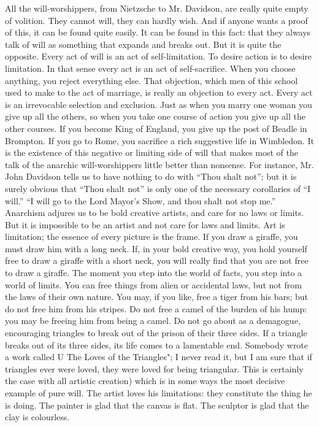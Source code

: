 \documentclass{book}
\begin{document}
All the will-worshippers, from Nietzsche to Mr. Davidson, are really quite empty of volition. They cannot will, they can hardly wish. And if anyone wants a proof of this, it can be found quite easily. It can be found in this fact: that they always talk of will as something that expands and breaks out. But it is quite the opposite. Every act of will is an act of self-limitation. To desire action is to desire limitation. In that sense every act is an act of self-sacrifice. When you choose anything, you reject everything else. That objection, which men of this school used to make to the act of marriage, is really an objection to every act. Every act is an irrevocable selection and exclusion. Just as when you marry one woman you give up all the others, so when you take one course of action you give up all the other courses. If you become King of England, you give up the post of Beadle in Brompton. If you go to Rome, you sacrifice a rich suggestive life in Wimbledon. It is the existence of this negative or limiting side of will that makes most of the talk of the anarchic will-worshippers little better than nonsense. For instance, Mr. John Davidson tells us to have nothing to do with “Thou shalt not”; but it is surely obvious that “Thou shalt not” is only one of the necessary corollaries of “I will.” “I will go to the Lord Mayor’s Show, and thou shalt not stop me.” Anarchism adjures us to be bold creative artists, and care for no laws or limits. But it is impossible to be an artist and not care for laws and limits. Art is limitation; the essence of every picture is the frame. If you draw a giraffe, you must draw him with a long neck. If, in your bold creative way, you hold yourself free to draw a giraffe with a short neck, you will really find that you are not free to draw a giraffe. The moment you step into the world of facts, you step into a world of limits. You can free things from alien or accidental laws, but not from the laws of their own nature. You may, if you like, free a tiger from his bars; but do not free him from his stripes. Do not free a camel of the burden of his hump: you may be freeing him from being a camel. Do not go about as a demagogue, encouraging triangles to break out of the prison of their three sides. If a triangle breaks out of its three sides, its life comes to a lamentable end. Somebody wrote a work called U The Loves of the Triangles"; I never read it, but I am sure that if triangles ever were loved, they were loved for being triangular. This is certainly the case with all artistic creation) which is in some ways the most decisive example of pure will. The artist loves his limitations: they constitute the thing he is doing. The painter is glad that the canvas is flat. The sculptor is glad that the clay is colourless.
\end{document}
